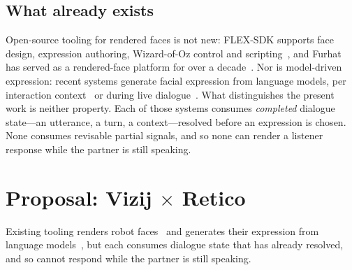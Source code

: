 \documentclass[conference]{IEEEtran}
\begin{document}
%
%
\subsection{What already exists}

Open-source tooling for rendered faces is not new: FLEX-SDK supports face
design, expression authoring, Wizard-of-Oz control and
scripting~\cite{alvesoliveira2022flexsdk}, and Furhat has served as a
rendered-face platform for over a decade~\cite{almoubayed2012furhat}. Nor is
model-driven expression: recent systems generate facial expression from
language models, per interaction context~\cite{antony2025xpress} or during
live dialogue~\cite{hasumoto2023llmemotion}. What distinguishes the present
work is neither property. Each of those systems consumes \emph{completed}
dialogue state---an utterance, a turn, a context---resolved before an
expression is chosen. None consumes revisable partial signals, and so none can
render a listener response while the partner is still speaking.

\section{Proposal: Vizij $\times$ Retico}

Existing tooling renders robot faces~\cite{alvesoliveira2022flexsdk} and
generates their expression from language
models~\cite{antony2025xpress, hasumoto2023llmemotion}, but each consumes
dialogue state that has already resolved, and so cannot respond while the
partner is still speaking.
\end{document}
